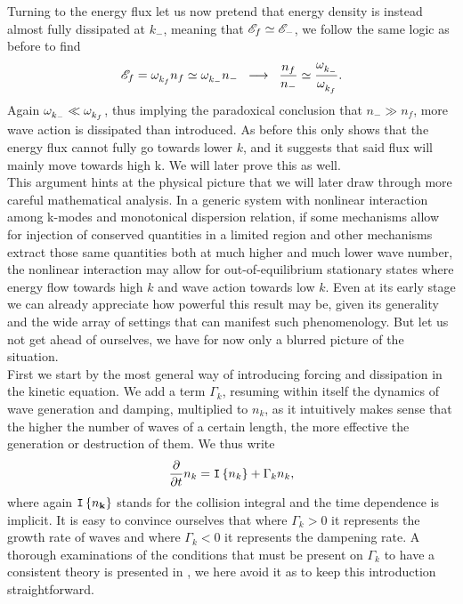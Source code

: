 Turning to the energy flux let us now pretend that energy density is instead almost fully dissipated at $k_-$, meaning that $\mathscr{E}_f \simeq \mathscr{E}_-$, we follow the same 
logic as before to find
\begin{equation}
    \mathscr{E}_f = \omega^{}_{k_f}n_f \simeq \omega^{}_{k_-}n_- \hspace{2mm} \longrightarrow \hspace{2mm} \frac{n_f}{n_-} \simeq \frac{\omega^{}_{k_-}}{\omega^{}_{k_f}}.
\end{equation}   
Again $\omega^{}_{k_-} \ll \omega^{}_{k_f}$, thus implying the paradoxical conclusion that $n_- \gg n_f$, more wave action is dissipated than introduced. As before this only 
shows that the energy flux cannot fully go towards lower $k$, and it suggests that said flux will mainly move towards high k. We will later prove this as well. \\
This argument hints at the physical picture that we will later draw through more careful mathematical analysis. In a generic system with nonlinear interaction among 
k-modes and monotonical dispersion relation, if some mechanisms allow for injection of conserved quantities in a limited region and other mechanisms extract those
same quantities both at much higher and much lower wave number, the nonlinear interaction may allow for out-of-equilibrium stationary states where energy flow towards high
$k$ and wave action towards low $k$. Even at its early stage we can already appreciate how powerful this result may be, given its generality and the wide array of settings
that can manifest such phenomenology. But let us not get ahead of ourselves, we have for now only a blurred picture of the situation. \\

First we start by the most general way of introducing forcing and dissipation in the kinetic equation. We add a term $\Gamma_k$, resuming within itself the dynamics of 
wave generation and damping, multiplied to $n_k$, as it intuitively makes sense that the higher the number of waves of a certain length, the more effective the generation
or destruction of them. We thus write
\begin{equation}
    \frac{\partial}{\partial t} n_k = \mathtt{I}\left\{n_k\right\}+ \Gamma_k n_k, 
    \label{kineticgamma}
\end{equation} 
where again $\mathtt{I}\left\{n_\mathbf{k}\right\}$ stands for the collision integral and the time dependence is implicit. It is easy to convince ourselves that where $\Gamma_k > 0$ it represents the growth rate of waves and 
where $\Gamma_k < 0$ it represents the dampening rate. A thorough examinations of the conditions that must be present on $\Gamma_k$ to have a consistent theory
is presented in \cite{Zakharov}, we here avoid it as to keep this introduction straightforward.\\

